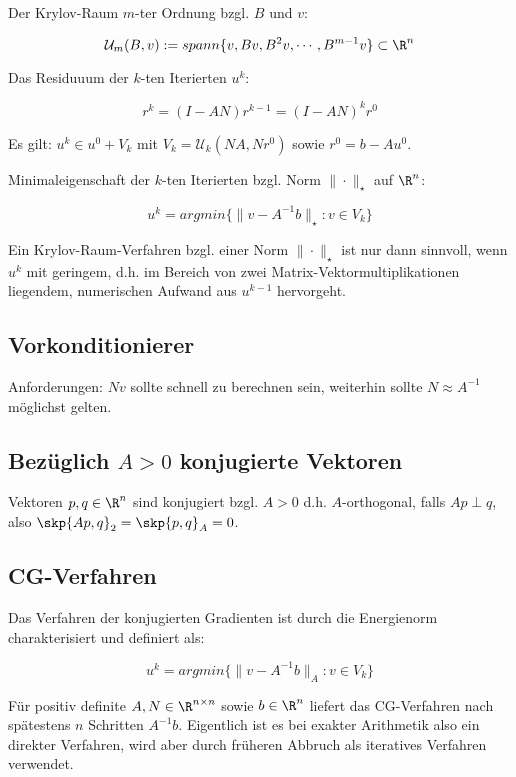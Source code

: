 Der Krylov-Raum $m$-ter Ordnung bzgl. $B$ und $v$:

\vspace{-4mm}
$$\mathcal{U}_m(B,v) := spann\{v,Bv,B^2v, \cdots, B^{m-1}v\} \subset \R^n$$

Das Residuuum der $k$-ten Iterierten $u^k$:

\vspace{-2mm}
$$r^k=(I-AN)r^{k-1} = (I-AN)^kr^0$$

Es gilt: $u^k \in u^0 + V_k$ mit $V_k = \mathcal{U}_k(NA,Nr^0)$ sowie $r^0 = b - Au^0$.

Minimaleigenschaft der $k$-ten Iterierten bzgl. Norm $\|\cdot\|_\star$ auf $\R^n$:

\vspace{-2mm}
$$u^k = argmin\{\|v - A^{-1}b\|_\star : v \in V_k\}$$

Ein Krylov-Raum-Verfahren bzgl. einer Norm $\|\cdot\|_\star$ ist nur dann sinnvoll, wenn $u^k$ mit geringem, d.h. im Bereich von zwei Matrix-Vektormultiplikationen liegendem, numerischen Aufwand aus $u^{k-1}$ hervorgeht.

\subsection*{Vorkonditionierer}

Anforderungen: $Nv$ sollte schnell zu berechnen sein, weiterhin sollte $N \approx A^{-1}$ möglichst gelten.

\subsection*{Bezüglich $A > 0$ konjugierte Vektoren}

Vektoren $p, q \in \R^n$ sind konjugiert bzgl. $A > 0$ d.h. $A$-orthogonal, falls $Ap \perp q$, also $\skp{Ap,q}_2=\skp{p,q}_A=0$.

\subsection*{CG-Verfahren}

Das Verfahren der konjugierten Gradienten ist durch die Energienorm charakterisiert und definiert als:

\vspace{-2mm}
$$u^k = argmin\{\|v-A^{-1}b\|_A : v \in V_k\}$$

Für positiv definite $A, N \in \R^{n \times n}$ sowie $b \in \R^n$ liefert das CG-Verfahren nach spätestens $n$ Schritten $A^{-1}b$. Eigentlich ist es bei exakter Arithmetik also ein direkter Verfahren, wird aber durch früheren Abbruch als iteratives Verfahren verwendet.

